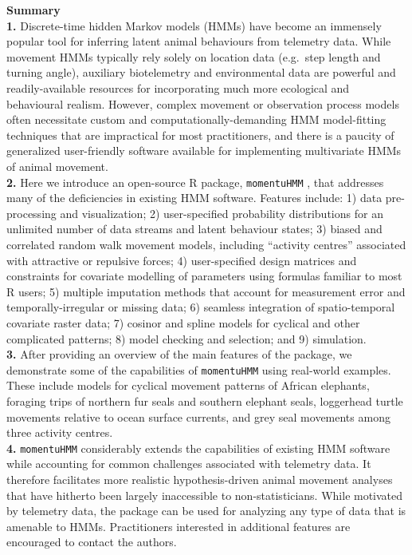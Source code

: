 \documentclass[12pt]{article}\usepackage[]{graphicx}\usepackage[]{color}
\begin{document}
\noindent \textbf{Summary}\\
\textbf{1.} Discrete-time hidden Markov models (HMMs) have become an immensely popular tool for inferring latent animal behaviours from telemetry data. While movement HMMs typically rely solely on location data (e.g.\ step length and turning angle), auxiliary biotelemetry and environmental data are powerful and readily-available resources for incorporating much more ecological and behavioural realism. However, complex movement or observation process models often necessitate custom and computationally-demanding HMM model-fitting techniques that are impractical for most practitioners, and there is a paucity of generalized user-friendly software available for implementing multivariate HMMs of animal movement.\\
\textbf{2.} Here we introduce an open-source R package, \verb|momentuHMM|%
, that addresses many of the deficiencies in existing HMM software.  Features include: 1) data pre-processing and visualization; 2) user-specified probability distributions for an unlimited number of data streams and latent behaviour states; %
3) biased and correlated random walk movement models, including ``activity centres'' associated with attractive or repulsive forces; 4) user-specified design matrices and constraints for covariate modelling of parameters using formulas familiar to most R users; 5) multiple imputation methods that account for measurement error and temporally-irregular or missing data; 6) seamless integration of spatio-temporal covariate raster data; 7) cosinor and spline models for cyclical and other complicated patterns; 8) model checking and selection; and 9) simulation.\\%
\textbf{3.} %
After providing an overview of the main features of the package, we demonstrate some of the capabilities of \verb|momentuHMM| using real-world examples. These include models for cyclical movement patterns of African elephants, foraging trips of northern fur seals and southern elephant seals, loggerhead turtle movements relative to ocean surface currents, and grey seal movements among three activity centres.
\\
\textbf{4.} \verb|momentuHMM| considerably extends the capabilities of existing HMM software while accounting for common challenges associated with telemetry data. It therefore facilitates more realistic hypothesis-driven animal movement analyses that have hitherto been largely inaccessible to non-statisticians.  While motivated by telemetry data, the package can be used for analyzing any type of data that is amenable to HMMs. Practitioners interested in additional features are encouraged to contact the authors. %
\\
\end{document}
